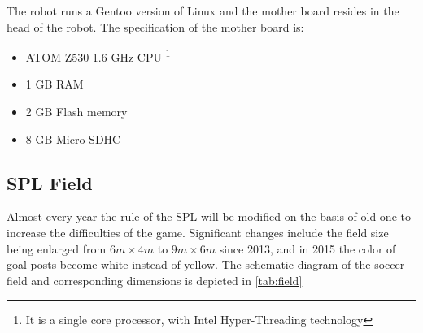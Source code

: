 The robot runs a Gentoo version of Linux and the mother board resides in the head of the robot. The specification of the mother board is:
\begin{itemize}
  \item ATOM Z530 1.6 GHz CPU \footnote{It is a single core processor, with Intel Hyper-Threading technology}
  \item 1 GB RAM
  \item 2 GB Flash memory
\item 8 GB Micro SDHC
\end{itemize}

\subsection[Standard Platform League Field]{\gls{SPL} Field}
Almost every year the rule of the \gls{SPL} will be modified on the basis of old one to increase the difficulties of the game. Significant changes include the field size being enlarged from $6m \times 4m$ to $9m \times 6m$ since 2013, and in 2015 the color of goal posts become white instead of yellow. The schematic diagram of the soccer field and corresponding dimensions is depicted in \autoref{tab:field}

